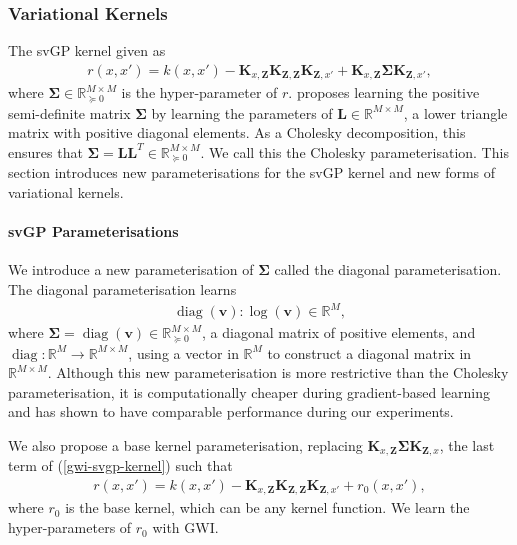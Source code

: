 \documentclass{article}
\newcommand{\diag}{\operatorname{diag}}
\numberwithin{equation}{section}
\begin{document}
\subsubsection{Variational Kernels}\label{variational-kernels}
The svGP kernel given as
\begin{align}
    r(x, x') = k(x, x') - \mathbf{K}_{x, \mathbf{Z}} \mathbf{K}_{\mathbf{Z}, \mathbf{Z}} \mathbf{K}_{\mathbf{Z}, x'} + \mathbf{K}_{x, \mathbf{Z}} \mathbf{\Sigma} \mathbf{K}_{\mathbf{Z}, x'},
    \label{gwi-svgp-kernel}
\end{align}
where $\mathbf{\Sigma} \in \mathbb{R}^{M \times M}_{\succcurlyeq 0}$ is the hyper-parameter of $r$. 
\cite{wild2022generalized} proposes learning the positive semi-definite matrix $\mathbf{\Sigma}$ by learning the parameters of $\mathbf{L} \in \mathbb{R}^{M \times M}$, a lower triangle matrix with positive diagonal elements.
As a Cholesky decomposition, this ensures that $\mathbf{\Sigma} = \mathbf{L}\mathbf{L}^T \in \mathbb{R}^{M \times M}_{\succcurlyeq 0}$. 
We call this the Cholesky parameterisation. 
This section introduces new parameterisations for the svGP kernel and new forms of variational kernels.

\paragraph{svGP Parameterisations}
We introduce a new parameterisation of $\mathbf{\Sigma}$ called the diagonal parameterisation. The diagonal parameterisation learns
\begin{align}
    \diag(\mathbf{v}): \log(\mathbf{v}) \in \mathbb{R}^M,
\end{align}
where $\mathbf{\Sigma} = \diag(\mathbf{v}) \in \mathbb{R}^{M \times M}_{\succcurlyeq 0}$, a diagonal matrix of positive elements, and $\diag: \mathbb{R}^M \rightarrow \mathbb{R}^{M \times M}$, using a vector in $\mathbb{R}^M$ to construct a diagonal matrix in $\mathbb{R}^{M \times M}$.
Although this new parameterisation is more restrictive than the Cholesky parameterisation, it is computationally cheaper during gradient-based learning and has shown to have comparable performance during our experiments.

We also propose a base kernel parameterisation, replacing $\mathbf{K}_{x, \mathbf{Z}} \mathbf{\Sigma} \mathbf{K}_{\mathbf{Z}, x}$, the last term of (\ref{gwi-svgp-kernel}) such that
\begin{align}
    r(x, x') = k(x, x') - \mathbf{K}_{x, \mathbf{Z}} \mathbf{K}_{\mathbf{Z}, \mathbf{Z}} \mathbf{K}_{\mathbf{Z}, x'} + r_0(x, x'),
\end{align}
where $r_0$ is the base kernel, which can be any kernel function. We learn the hyper-parameters of $r_0$ with GWI.
\end{document}
